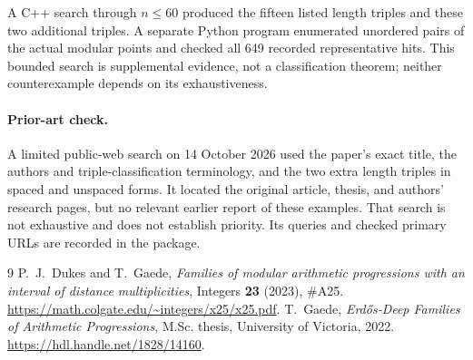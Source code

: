 \documentclass[11pt]{article}
\begin{document}
A C++ search through $n\le60$ produced the fifteen listed length
triples and these two additional triples. A separate Python
program enumerated unordered pairs of the actual modular points
and checked all 649 recorded representative hits. This bounded
search is supplemental evidence, not a classification theorem;
neither counterexample depends on its exhaustiveness.

\paragraph{Prior-art check.}
A limited public-web search on 14 October 2026 used the paper's
exact title, the authors and triple-classification terminology,
and the two extra length triples in spaced and unspaced forms.
It located the original article, thesis, and authors' research
pages, but no relevant earlier report of these examples. That
search is not exhaustive and does not establish priority. Its
queries and checked primary URLs are recorded in the package.

\begin{thebibliography}{9}
 P.~J.~Dukes and T.~Gaede,
\emph{Families of modular arithmetic progressions with an interval
of distance multiplicities}, Integers \textbf{23} (2023), \#A25.
\url{https://math.colgate.edu/~integers/x25/x25.pdf}.
 T.~Gaede,
\emph{Erd\H{o}s-Deep Families of Arithmetic Progressions},
M.Sc. thesis, University of Victoria, 2022.
\url{https://hdl.handle.net/1828/14160}.
\end{thebibliography}
\end{document}

